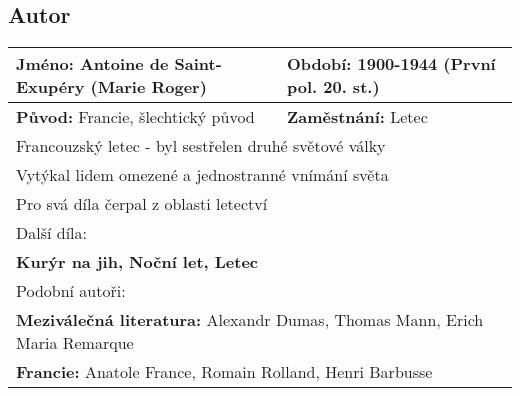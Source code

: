 \subsection*{Autor}
\begin{tabularx}{\linewidth}{l|l}
  \textbf{Jméno:} Antoine de Saint-Exupéry (Marie Roger) & \textbf{Období:} 1900-1944 (První pol. 20. st.) \\
  \hline
  \textbf{Původ:} Francie, šlechtický původ              & \textbf{Zaměstnání:} Letec                      \\
  \hline
  \multicolumn{2}{l}{Francouzský letec - byl sestřelen druhé světové války}                                \\
  \multicolumn{2}{l}{Vytýkal lidem omezené a jednostranné vnímání světa}                                   \\
  \multicolumn{2}{l}{Pro svá díla čerpal z oblasti letectví}                                               \\
  \hline
  \multicolumn{2}{l}{Další díla:}                                                                          \\
  \multicolumn{2}{l}{\textbf{Kurýr na jih, Noční let, Letec}}                                              \\
  \hline
  \multicolumn{2}{l}{Podobní autoři:}                                                                      \\
  \multicolumn{2}{l}{\textbf{Meziválečná literatura:} Alexandr Dumas, Thomas Mann, Erich Maria Remarque}   \\
  \multicolumn{2}{l}{\textbf{Francie:} Anatole France, Romain Rolland, Henri Barbusse}                     \\
\end{tabularx}
